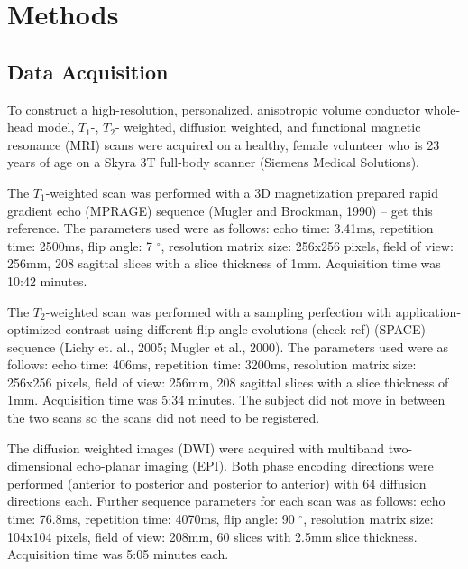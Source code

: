 
\section{Methods}
\label{sec:Methods}


\subsection{Data Acquisition}
\label{sec:Data}


To construct a high-resolution, personalized, anisotropic volume conductor whole-head model, $T_1$-, $T_2$- weighted, diffusion weighted, and functional magnetic resonance (MRI) scans were acquired on a healthy, female volunteer who is 23 years of age on a Skyra 3T full-body scanner (Siemens Medical Solutions). 

The $T_1$-weighted scan was performed with a 3D magnetization prepared rapid gradient echo (MPRAGE) sequence (Mugler and Brookman, 1990) -- get this reference. The parameters used were as follows: echo time: 3.41ms, repetition time: 2500ms, flip angle: 7 $^{\circ}$, resolution matrix size: 256x256 pixels, field of view: 256mm, 208 sagittal slices with a slice thickness of 1mm. Acquisition time was 10:42 minutes. 

The $T_2$-weighted scan was performed with a sampling perfection with application-optimized contrast using different flip angle evolutions (check ref) (SPACE) sequence (Lichy et. al., 2005; Mugler et al., 2000). The parameters used were as follows: echo time: 406ms, repetition time: 3200ms, resolution matrix size: 256x256 pixels, field of view: 256mm, 208 sagittal slices with a slice thickness of 1mm. Acquisition time was 5:34 minutes. The subject did not move in between the two scans so the scans did not need to be registered. 

The diffusion weighted images (DWI) were acquired with multiband two-dimensional echo-planar imaging (EPI). Both phase encoding directions were performed (anterior to posterior and posterior to anterior) with 64 diffusion directions each. Further sequence parameters for each scan was as follows: echo time: 76.8ms, repetition time: 4070ms, flip angle: 90 $^{\circ}$, resolution matrix size: 104x104 pixels, field of view: 208mm, 60 slices with 2.5mm slice thickness. Acquisition time was 5:05 minutes each. 

